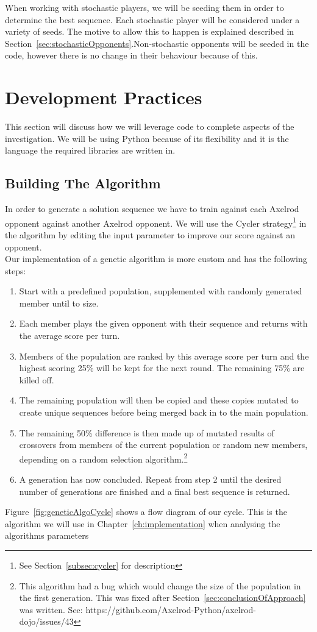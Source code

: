 When working with stochastic players, we will be seeding them in order to determine the best sequence.
Each stochastic player will be considered under a variety of seeds.
The motive to allow this to happen is explained described in Section~\ref{sec:stochasticOpponents}.Non-stochastic opponents will be seeded in the code, however there is no change in their behaviour because of this.

\section{Development Practices}\label{sec:codeTechniques}
This section will discuss how we will leverage code to complete aspects of the investigation.
We will be using Python because of its flexibility and it is the language the required libraries are written in.

\subsection{Building The Algorithm}\label{subsec:buildingTheAlgorthem}
In order to generate a solution sequence we have to train against each Axelrod opponent against another Axelrod opponent.
We will use the Cycler strategy\footnote{See Section~\ref{subsec:cycler} for description} in the algorithm by editing the input parameter to improve our score against an opponent.\\

Our implementation of a genetic algorithm is more custom and has the following steps:
\begin{enumerate}
    \item Start with a predefined population, supplemented with randomly generated member until to size.
    \item Each member plays the given opponent with their sequence and returns with the average score per turn.
    \item Members of the population are ranked by this average score per turn and the highest scoring 25\% will be kept for the next round.
    The remaining 75\% are killed off.
    \item The remaining population will then be copied and these copies mutated to create unique sequences before being merged back in to the main population.
    \item The remaining 50\% difference is then made up of mutated results of crossovers from members of the current population or random new members, depending on a random selection algorithm.\footnote{This algorithm had a bug which would change the size of the population in the first generation.
    This was fixed after Section~\ref{sec:conclusionOfApproach} was written.
    See: https://github.com/Axelrod-Python/axelrod-dojo/issues/43}
    \item A generation has now concluded.
    Repeat from step 2 until the desired number of generations are finished and a final best sequence is returned.
\end{enumerate}
Figure~\ref{fig:geneticAlgoCycle} shows a flow diagram of our cycle.
This is the algorithm we will use in Chapter~\ref{ch:implementation} when analysing the algorithms parameters\\

